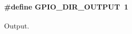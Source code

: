 \paragraph[{\texorpdfstring{G\+P\+I\+O\+\_\+\+D\+I\+R\+\_\+\+O\+U\+T\+P\+UT}{GPIO_DIR_OUTPUT}}]{\setlength{\rightskip}{0pt plus 5cm}\#define G\+P\+I\+O\+\_\+\+D\+I\+R\+\_\+\+O\+U\+T\+P\+UT~1}\hypertarget{group___g_p_i_o___d_i_r___d_e_f_gae9bb804807d0819629660c6e97934e37}{}\label{group___g_p_i_o___d_i_r___d_e_f_gae9bb804807d0819629660c6e97934e37}
Output. 